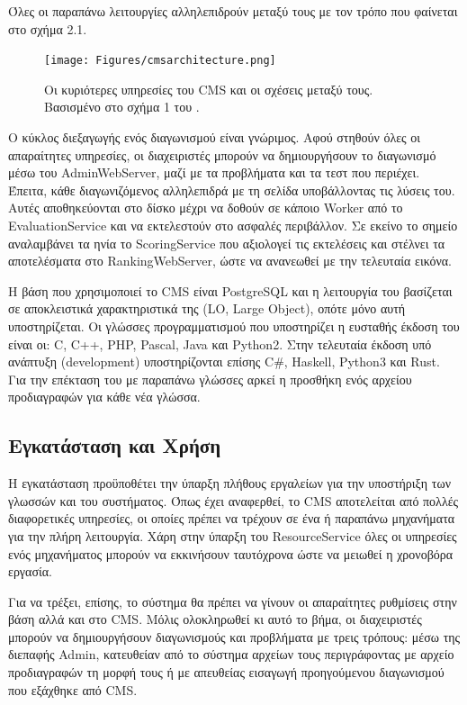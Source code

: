 \documentclass[diploma]{softlab-thesis}
\begin{document}
\bigskip

Όλες οι παραπάνω λειτουργίες αλληλεπιδρούν μεταξύ τους με τον τρόπο που φαίνεται
στο σχήμα 2.1.

\begin{figure}
  \centering
  \texttt{[image: Figures/cmsarchitecture.png]}
  \caption[Η αρχιτεκτονική του CMS]{Οι κυριότερες υπηρεσίες του CMS και οι
  σχέσεις μεταξύ τους. Βασισμένο στο σχήμα 1 του
  \cite{maggiolo2012introducing}.}
\end{figure}

\bigskip

Ο κύκλος διεξαγωγής ενός διαγωνισμού είναι γνώριμος. Αφού στηθούν όλες οι
απαραίτητες υπηρεσίες, οι διαχειριστές μπορούν να δημιουργήσουν το διαγωνισμό
μέσω του AdminWebServer, μαζί με τα προβλήματα και τα τεστ που περιέχει.
Έπειτα, κάθε διαγωνιζόμενος αλληλεπιδρά με τη σελίδα υποβάλλοντας τις λύσεις
του. Αυτές αποθηκεύονται στο δίσκο μέχρι να δοθούν σε κάποιο Worker από το
EvaluationService και να εκτελεστούν στο ασφαλές περιβάλλον. Σε εκείνο το
σημείο αναλαμβάνει τα ηνία το ScoringService που αξιολογεί τις εκτελέσεις και
στέλνει τα αποτελέσματα στο RankingWebServer, ώστε να ανανεωθεί με την
τελευταία εικόνα.

\bigskip

Η βάση που χρησιμοποιεί το CMS είναι PostgreSQL και η λειτουργία του βασίζεται
σε αποκλειστικά χαρακτηριστικά της (LO, Large Object), οπότε μόνο αυτή
υποστηρίζεται. Οι γλώσσες προγραμματισμού που υποστηρίζει η ευσταθής έκδοση του
είναι οι: C, C++, PHP, Pascal, Java και Python2. Στην τελευταία έκδοση υπό
ανάπτυξη (development) υποστηρίζονται επίσης C\#, Haskell, Python3 και Rust.
Για την επέκταση του με παραπάνω γλώσσες αρκεί η προσθήκη ενός αρχείου
προδιαγραφών για κάθε νέα γλώσσα.

\subsection{Εγκατάσταση και Χρήση}

Η εγκατάσταση προϋποθέτει την ύπαρξη πλήθους εργαλείων για την υποστήριξη των
γλωσσών και του συστήματος. Όπως έχει αναφερθεί, το CMS αποτελείται από πολλές
διαφορετικές υπηρεσίες, οι οποίες πρέπει να τρέχουν σε ένα ή παραπάνω μηχανήματα
για την πλήρη λειτουργία. Χάρη στην ύπαρξη του ResourceService όλες οι υπηρεσίες
ενός μηχανήματος μπορούν να εκκινήσουν ταυτόχρονα ώστε να μειωθεί η χρονοβόρα
εργασία.

\bigskip

Για να τρέξει, επίσης, το σύστημα θα πρέπει να γίνουν οι απαραίτητες ρυθμίσεις
στην βάση αλλά και στο CMS. Μόλις ολοκληρωθεί κι αυτό το βήμα, οι διαχειριστές
μπορούν να δημιουργήσουν διαγωνισμούς και προβλήματα με τρεις τρόπους: μέσω της
διεπαφής Admin, κατευθείαν από το σύστημα αρχείων τους περιγράφοντας με αρχείο
προδιαγραφών τη μορφή τους ή με απευθείας εισαγωγή προηγούμενου διαγωνισμού που
εξάχθηκε από CMS.
\end{document}
